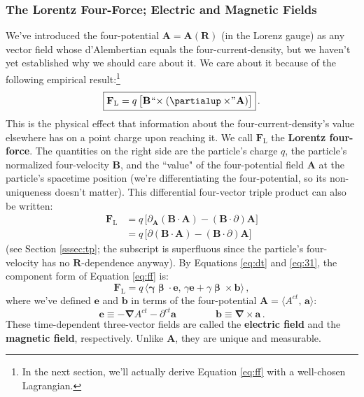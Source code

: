 \documentclass[12pt]{article}
\renewcommand{\vv}[1]{\mathbf{#1}}
\newcommand{\vvbeta}{\bm{\upbeta}}
\newcommand{\del}{\boldsymbol{\nabla}}
\begin{document}
\subsubsection{The Lorentz Four-Force; Electric and Magnetic Fields}\label{sssec:lff}

We've introduced the four-potential $\vv A = \vv A (\vv R)$ (in the Lorenz gauge) as any vector field whose d'Alembertian equals the four-current-density, but we haven't yet established why we should care about it. We care about it because of the following empirical result:\footnote{In the next section, we'll actually derive Equation \ref{eq:ff} with a well-chosen Lagrangian.}
\begin{equation}\label{eq:ff}
\boxed{\vv F_{\textrm{L}} = q \, \bigl[ \vv B \mkern1mu `` \mkern-4mu \times (\partialup \times \mkern-4mu " \mkern1mu \vv A) \bigr]} \, .
\end{equation}
This is the physical effect that information about the four-current-density's value elsewhere has on a point charge upon reaching it. We call $\vv F_{\textrm{L}}$ the \textbf{Lorentz four-force}. The quantities on the right side are the particle's charge $q$, the particle's normalized four-velocity $\vv B$, and the ``value" of the four-potential field $\vv A$ at the particle's spacetime position (we're differentiating the four-potential, so its non-uniqueness doesn't matter). This differential four-vector triple product can also be written:
\begin{equation*}
\begin{split}
\vv F_{\textrm{L}} &= q \, \bigl[ \partialup_{\vv A} (\vv B \cdot \vv A) - (\vv B \cdot \partialup) \vv A \bigr] \\
&= q \, \bigl[ \partialup (\vv B \cdot \vv A) - (\vv B \cdot \partialup) \vv A \bigr] 
\end{split}
\end{equation*}
(see Section \ref{sssec:tp}; the subscript is superfluous since the particle's four-velocity has no $\vv R$-dependence anyway). By Equations \ref{eq:dt} and \ref{eq:31}, the component form of Equation \ref{eq:ff} is:
\begin{equation}\label{eq:lfc}
\boxed{ \vv F_{\textrm{L}} = q \, \big \langle \vv \gamma \vvbeta \cdot \vv e , \, \gamma \vv e + \gamma \vvbeta \times \vv b \big \rangle } \, ,
\end{equation}
where we've defined $\vv e$ and $\vv b$ in terms of the four-potential $\vv A = \langle A^{ct}, \, \vv a \rangle$:
\begin{equation}\label{eq:eb}
\boxed{ \vv e \equiv - \del A^{ct} - \partial^{ct} \vv a \qquad \qquad \vv b \equiv \del \times \vv a } \, .
\end{equation}
These time-dependent three-vector fields are called the \textbf{electric field} and the \textbf{magnetic field}, respectively. Unlike $\vv A$, they are unique and measurable.
\end{document}
